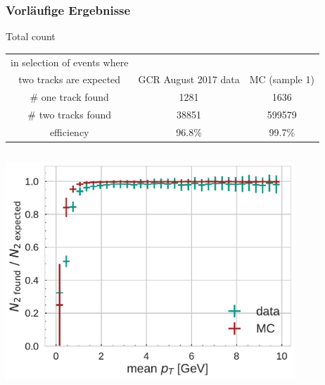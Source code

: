 \documentclass[18pt]{beamer}
\begin{document}
\begin{frame}
  \frametitle{Vorläufige Ergebnisse}
  \begin{block}{Total count}
  \begin{tabular}{c|cc}
    in selection of events where\\two tracks are expected & GCR August 2017 data &  MC (sample 1)\\
    \hline
    \# one track found & 1281 & 1636 \\
    \# two tracks found &  38851 & 599579\\
    efficiency & 96.8\% & 99.7\% \\
  \end{tabular}
\end{block}
\begin{columns}
  \begin{column}{0.5\textwidth}
    \includegraphics[width=0.85\textwidth]{figures/efficiency_study/cosmicbased_findeff_over_pt.pdf}
  \end{column}
  \begin{column}{0.5\textwidth}
  \end{column}
\end{columns}
\end{frame}
\end{document}
